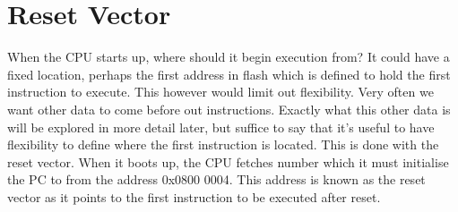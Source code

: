 \section{Reset Vector}
When the CPU starts up, where should it begin execution from? It could have a fixed location, perhaps the first address in flash which is defined to hold the first instruction to execute. This however would limit out flexibility. Very often we want other data to come before out instructions. Exactly what this other data is will be explored in more detail later, but suffice to say that it's useful to have flexibility to define where the first instruction is located. This is done with the reset vector. When it boots up, the CPU fetches number which it must initialise the PC to from the address 0x0800 0004. This address is known as the reset vector as it points to the first instruction to be executed after reset.
